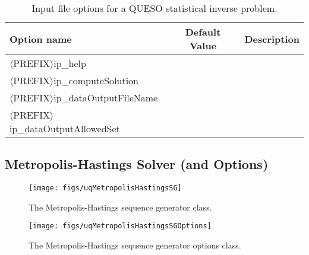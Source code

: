 \begin{table}[htpb]
\begin{center}
\caption{Input file options for a QUESO statistical inverse problem.}
\ttfamily

\begin{tabular}{l|c|c}
\toprule
\rmfamily Option name                    & \rmfamily Default  Value & \rmfamily Description \\
\midrule\midrule
$\langle$PREFIX$\rangle$ip\_help                 &         &             \\

$\langle$PREFIX$\rangle$ip\_computeSolution      &         &             \\

$\langle$PREFIX$\rangle$ip\_dataOutputFileName   &         &             \\

$\langle$PREFIX$\rangle$ip\_dataOutputAllowedSet &         &             \\
\bottomrule
\end{tabular}
\end{center}

\label{tab-sip-options}
\end{table}



\subsection{Metropolis-Hastings Solver (and Options)}

\begin{figure}[htpb]
\centering
\texttt{[image: figs/uqMetropolisHastingsSG]}
\vspace*{-8pt}
\caption{The Metropolis-Hastings sequence generator class.}
\label{fig-metropolis-hastings-solver-class}
\end{figure}

\begin{figure}[htpb]
\centering
\texttt{[image: figs/uqMetropolisHastingsSGOptions]}
\vspace*{-8pt}
\caption{The Metropolis-Hastings sequence generator options class.}
\label{fig-metropolis-hastings-options-class}
\end{figure}

